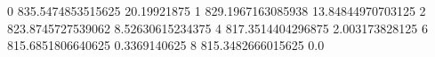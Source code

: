 0 835.5474853515625 20.19921875
1 829.1967163085938 13.84844970703125
2 823.8745727539062 8.52630615234375
4 817.3514404296875 2.003173828125
6 815.6851806640625 0.3369140625
8 815.3482666015625 0.0
